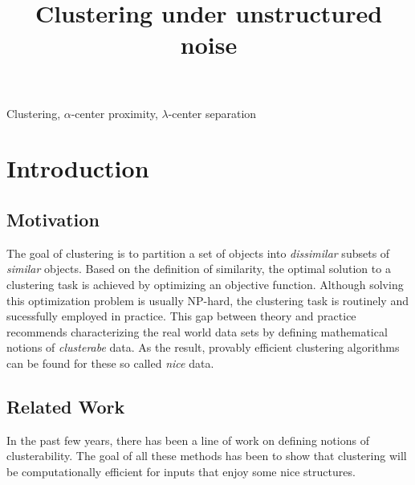 \documentclass[anon,12pt]{colt2016} %
\title[Sparse Noise]{Clustering under unstructured noise}
\begin{document}
\maketitle

\begin{abstract}

\end{abstract}

\begin{keywords}
Clustering, $\alpha$-center proximity, $\lambda$-center separation
\end{keywords}

\section{Introduction}
\subsection{Motivation}

The goal of clustering is to partition a set of objects into {\em dissimilar} subsets of {\em similar} objects. Based on the definition of similarity, the optimal solution to a clustering task is achieved by optimizing an objective function. Although solving this optimization problem is usually NP-hard, the clustering task is routinely and sucessfully employed in practice. This gap between theory and practice recommends characterizing the real world data sets by defining mathematical notions of {\em clusterabe} data. As the result, provably efficient clustering algorithms can be found for these so called {\em nice} data.  


\subsection{Related Work}

In the past few years, there has been a line of work on defining notions of clusterability. The goal of all these methods has been to show that clustering will be computationally efficient for inputs that enjoy some nice structures. 

%
%
\end{document}
